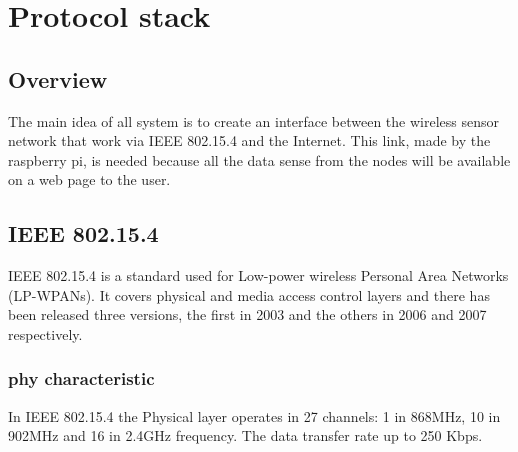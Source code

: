 \section{Protocol stack}
\subsection{Overview}
The main idea of all system is to create an interface between the wireless sensor network that work via IEEE 802.15.4 and the Internet. This link, made by the raspberry pi, is needed because all the data sense from the nodes will be available on a web page to the user. 

\subsection{IEEE 802.15.4}
IEEE 802.15.4 is a standard used for Low-power wireless Personal Area Networks (LP-WPANs). It covers physical and media access control layers and there has been released three versions, the first in 2003 and the others in 2006 and 2007 respectively.
\subsubsection{phy characteristic}
In IEEE 802.15.4 the Physical layer operates in 27 channels: 1 in 868MHz, 10 in 902MHz and 16 in 2.4GHz frequency. The data transfer rate up to 250 Kbps.\cite{slide}\\
